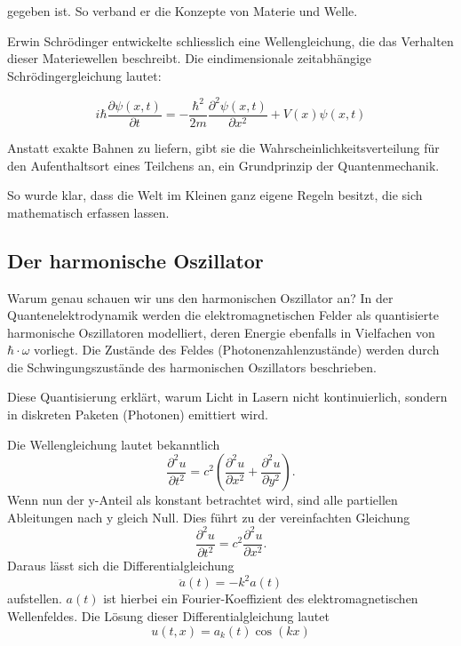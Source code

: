 	
	gegeben ist. So verband er die Konzepte von Materie und Welle.
	
	Erwin Schrödinger entwickelte schliesslich eine Wellengleichung, die das Verhalten dieser Materiewellen beschreibt.
	Die eindimensionale zeitabhängige Schrödingergleichung lautet:
	
	\begin{equation}
		i \hbar \frac{\partial \psi(x,t)}{\partial t} = -\frac{\hbar^2}{2m} \frac{\partial^2 \psi(x,t)}{\partial x^2} + V(x) \psi(x,t)
	\end{equation}
	
	
	Anstatt exakte Bahnen zu liefern, gibt sie die Wahrscheinlichkeitsverteilung für den Aufenthaltsort eines Teilchens an, ein Grundprinzip der Quantenmechanik.
	
	So wurde klar, dass die Welt im Kleinen ganz eigene Regeln besitzt, die sich mathematisch erfassen lassen.
	
	
	

\subsection{Der harmonische Oszillator\label{fourier:subsection:derHarmonischeOszillator}}
Warum genau schauen wir uns den harmonischen Oszillator an?
In der Quantenelektrodynamik werden die elektromagnetischen Felder als quantisierte harmonische Oszillatoren modelliert, deren Energie ebenfalls in Vielfachen von $\hbar\cdot\omega$ vorliegt.
Die Zustände des Feldes (Photonenzahlenzustände) werden durch die Schwingungszustände des harmonischen Oszillators beschrieben.

Diese Quantisierung erklärt, warum Licht in Lasern nicht kontinuierlich, sondern in diskreten Paketen (Photonen) emittiert wird. %

Die Wellengleichung lautet bekanntlich
\begin{equation}
    \frac{\partial^2 u}{\partial t^2} = c^2 \left( \frac{\partial^2 u}{\partial x^2} + \frac{\partial^2 u}{\partial y^2} \right).
\end{equation}
Wenn nun der y-Anteil als konstant betrachtet wird, sind alle partiellen Ableitungen nach y gleich Null.
Dies führt zu der vereinfachten Gleichung
\begin{equation}
    \frac{\partial^2 u}{\partial t^2} = c^2 \frac{\partial^2 u}{\partial x^2}.
\end{equation}
Daraus lässt sich die Differentialgleichung
\begin{equation}
    \ddot{a}(t) = -k^2 a(t)
\end{equation}
aufstellen.
$a(t)$ ist hierbei ein Fourier-Koeffizient des elektromagnetischen Wellenfeldes.
Die Lösung dieser Differentialgleichung lautet
\begin{equation}
    u(t,x) = a_k(t) \cos(kx)
\end{equation}

